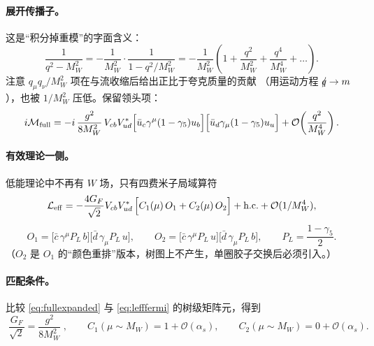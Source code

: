 \documentclass[UTF8,a4paper,11pt]{ctexart}
\theoremstyle{definition}
\theoremstyle{remark}
\theoremstyle{plain}
\newcommand{\qsl}{q\mkern-9.0mu/}
\newcommand{\as}{\alpha_s}
\begin{document}
\paragraph{展开传播子。}这是“积分掉重模”的字面含义：
\begin{equation}
  \frac{1}{q^2-M_W^2}
  =-\frac{1}{M_W^2}\cdot\frac{1}{1-q^2/M_W^2}
  =-\frac{1}{M_W^2}\left(1+\frac{q^2}{M_W^2}+\frac{q^4}{M_W^4}+\dots\right).
  \label{eq:propexpand}
\end{equation}
注意 $q_\mu q_\nu/M_W^2$ 项在与流收缩后给出正比于夸克质量的贡献
（用运动方程 $\qsl\to m$），也被 $1/M_W^2$ 压低。保留领头项：
\begin{equation}
  i\mathcal M_{\rm full}
  = -i\,\frac{g^2}{8M_W^2}\,V_{cb}V_{ud}^*
    \Big[\bar u_c\gamma^\mu(1-\gamma_5)u_b\Big]
    \Big[\bar u_d\gamma_\mu(1-\gamma_5)u_u\Big]
    +\mathcal O\!\left(\frac{q^2}{M_W^4}\right).
  \label{eq:fullexpanded}
\end{equation}

\paragraph{有效理论一侧。}低能理论中不再有 $W$ 场，只有四费米子局域算符
\begin{equation}
  \mathcal L_{\rm eff}
  =-\frac{4G_F}{\sqrt2}V_{cb}V_{ud}^*\,
   \Big[C_1(\mu)\,O_1+C_2(\mu)\,O_2\Big]+\text{h.c.}+\mathcal O(1/M_W^4),
  \label{eq:lefffermi}
\end{equation}
\begin{equation}
  O_1=\big[\bar c\,\gamma^\mu P_L\, b\big]\big[\bar d\,\gamma_\mu P_L\, u\big],
  \qquad
  O_2=\big[\bar c\,\gamma^\mu P_L\, u\big]\big[\bar d\,\gamma_\mu P_L\, b\big],
  \qquad P_L=\frac{1-\gamma_5}{2}.
\end{equation}
（$O_2$ 是 $O_1$ 的“颜色重排”版本，树图上不产生，单圈胶子交换后必须引入。）

\paragraph{匹配条件。}比较 \eqref{eq:fullexpanded} 与
\eqref{eq:lefffermi} 的树级矩阵元，得到
\begin{equation}
  \boxed{\;\frac{G_F}{\sqrt2}=\frac{g^2}{8M_W^2}\;},
  \qquad
  C_1(\mu\!\sim\! M_W)=1+\mathcal O(\as),
  \qquad
  C_2(\mu\!\sim\! M_W)=0+\mathcal O(\as).
  \label{eq:fermimatch}
\end{equation}
\end{document}
